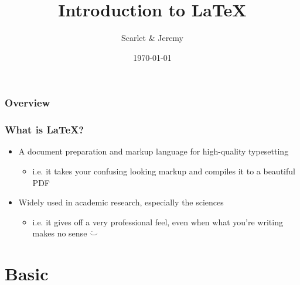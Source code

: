 \documentclass{beamer}
\title[Intro to \LaTeX]{Introduction to \LaTeX}
\author{Scarlet \& Jeremy}
\institute[Cornell University]{
Cornell University \\
\medskip
\textit{hy323 \& jlf248}
}
\date{\today}
\begin{document}
\begin{frame}
  \titlepage
\end{frame}

\begin{frame}
  \frametitle{Overview}
  \tableofcontents
\end{frame}

\begin{frame}
  \frametitle{What is \LaTeX?}
  \begin{itemize}
    \item A document preparation and markup language for high-quality typesetting
      \begin{itemize}
        \item i.e. it takes your confusing looking markup and compiles it to a beautiful PDF
      \end{itemize}
    \item Widely used in academic research, especially the sciences
      \begin{itemize}
        \item i.e. it gives off a very professional feel,
          even when what you're writing makes no sense $\ddot\smile$
      \end{itemize}
  \end{itemize}
\end{frame}

\section{Basic}
\end{document}
